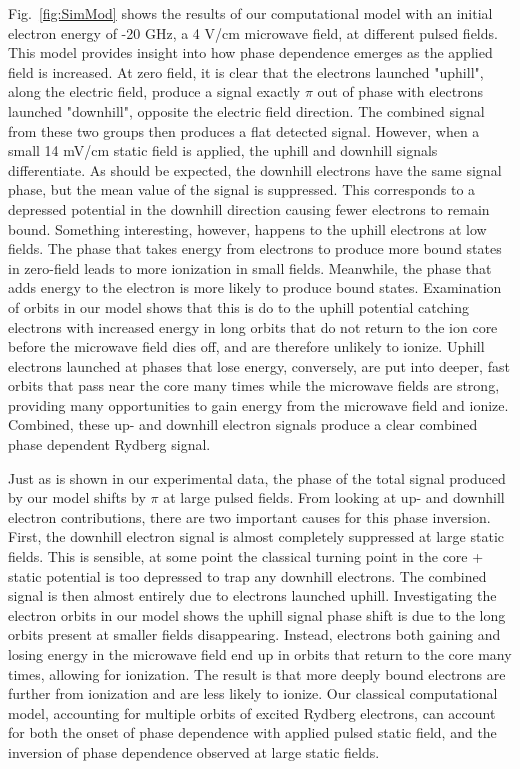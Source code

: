 \documentclass[aps,pra,preprint,groupedaddress]{revtex4-1}
\begin{document}
Fig.~\ref{fig:SimMod} shows the results of our computational model with an initial electron energy of -20 GHz, a 4 V/cm microwave field, at different pulsed fields. This model provides insight into how phase dependence emerges as the applied field is increased. At zero field, it is clear that the electrons launched "uphill", along the electric field, produce a signal exactly $\pi$ out of phase with electrons launched "downhill", opposite the electric field direction. The combined signal from these two groups then produces a flat detected signal. However, when a small 14 mV/cm static field is applied, the uphill and downhill signals differentiate. As should be expected, the downhill electrons have the same signal phase, but the mean value of the signal is suppressed. This corresponds to a depressed potential in the downhill direction causing fewer electrons to remain bound. Something interesting, however, happens to the uphill electrons at low fields. The phase that takes energy from electrons to produce more bound states in zero-field leads to more ionization in small fields. Meanwhile, the phase that adds energy to the electron is more likely to produce bound states. Examination of orbits in our model shows that this is do to the uphill potential catching electrons with increased energy in long orbits that do not return to the ion core before the microwave field dies off, and are therefore unlikely to ionize. Uphill electrons launched at phases that lose energy, conversely, are put into deeper, fast orbits that pass near the core many times while the microwave fields are strong, providing many opportunities to gain energy from the microwave field and ionize. Combined, these up- and downhill electron signals produce a clear combined phase dependent Rydberg signal.

Just as is shown in our experimental data, the phase of the total signal produced by our model shifts by $\pi$ at large pulsed fields. From looking at up- and downhill electron contributions, there are two important causes for this phase inversion. First, the downhill electron signal is almost completely suppressed at large static fields. This is sensible, at some point the classical turning point in the core + static potential is too depressed to trap any downhill electrons. The combined signal is then almost entirely due to electrons launched uphill. Investigating the electron orbits in our model shows the uphill signal phase shift is due to the long orbits present at smaller fields disappearing. Instead, electrons both gaining and losing energy in the microwave field end up in orbits that return to the core many times, allowing for ionization. The result is that more deeply bound electrons are further from ionization and are less likely to ionize. Our classical computational model, accounting for multiple orbits of excited Rydberg electrons, can account for both the onset of phase dependence with applied pulsed static field, and the inversion of phase dependence observed at large static fields.
\end{document}
